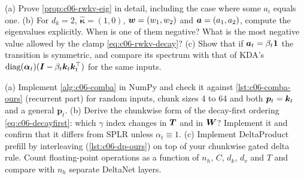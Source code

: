 \begin{exercise}\label{ex:c06-rwkv}
(a) Prove \cref{prop:c06-rwkv-eig} in detail, including the case where some $a_i$ equals one.
(b) For $d_k=2$, $\hat{\bm\kappa}=(1,0)$, $\bm{w}=(w_1,w_2)$ and $\bm{a}=(a_1,a_2)$, compute the
eigenvalues explicitly. When is one of them negative? What is the most negative value allowed
by the clamp \eqref{eq:c06-rwkv-decay}?
(c) Show that if $\bm{a}_t=\beta_t\bm1$ the transition is symmetric, and compare its spectrum with
that of KDA's $\operatorname{diag}(\bm{\alpha}_t)(\bm{I}-\beta_t\bm{k}_t\bm{k}_t^{\top})$ for the same inputs.
\end{exercise}

\begin{exercise}\label{ex:c06-code}
(a) Implement \cref{alg:c06-comba} in NumPy and check it against
\cref{lst:c06-comba-ours} (recurrent part) for random inputs, chunk sizes 4 to 64 and both
$\bm{p}_t=\bm{k}_t$ and a general $\bm{p}_t$.
(b) Derive the chunkwise form of the decay-first ordering \eqref{eq:c06-decayfirst}: which
$\gamma$ index changes in $\bm{T}$ and in $\bm{W}$? Implement it and confirm that it differs from
SPLR unless $\alpha_t\equiv1$.
(c) Implement DeltaProduct prefill by interleaving (\cref{lst:c06-dp-ours}) on top of your
chunkwise gated delta rule. Count floating-point operations as a function of $n_h$, $C$,
$d_k$, $d_v$ and $T$ and compare with $n_h$ separate DeltaNet layers.
\end{exercise}
